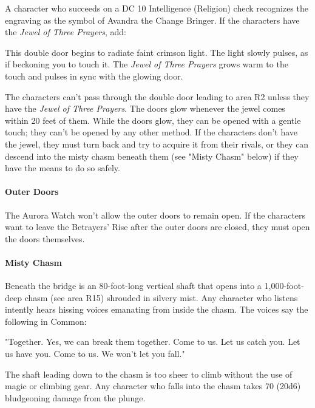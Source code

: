 \documentclass[letterpaper, 11pt, bg=full, twocolumn]{dndbook}
\begin{document}
A character who succeeds on a DC 10 Intelligence (Religion) check recognizes the engraving as the symbol of Avandra the Change Bringer. If the characters have the \textit{Jewel of Three Prayers}, add:

\begin{DndReadAloud}
This double door begins to radiate faint crimson light. The light slowly pulses, as if beckoning you to touch it. The \textit{Jewel of Three Prayers} grows warm to the touch and pulses in sync with the glowing door.
\end{DndReadAloud}

The characters can't pass through the double door leading to area R2 unless they have the \textit{Jewel of Three Prayers}. The doors glow whenever the jewel comes within 20 feet of them. While the doors glow, they can be opened with a gentle touch; they can't be opened by any other method. If the characters don't have the jewel, they must turn back and try to acquire it from their rivals, or they can descend into the misty chasm beneath them (see "Misty Chasm" below) if they have the means to do so safely.

\paragraph{Outer Doors}

The Aurora Watch won't allow the outer doors to remain open. If the characters want to leave the Betrayers' Rise after the outer doors are closed, they must open the doors themselves.

\paragraph{Misty Chasm}

Beneath the bridge is an 80-foot-long vertical shaft that opens into a 1,000-foot-deep chasm (see area R15) shrouded in silvery mist. Any character who listens intently hears hissing voices emanating from inside the chasm. The voices say the following in Common:

\begin{DndReadAloud}
"Together. Yes, we can break them together. Come to us. Let us catch you. Let us have you. Come to us. We won't let you fall."
\end{DndReadAloud}

The shaft leading down to the chasm is too sheer to climb without the use of magic or climbing gear. Any character who falls into the chasm takes 70 (20d6) bludgeoning damage from the plunge.
\end{document}
